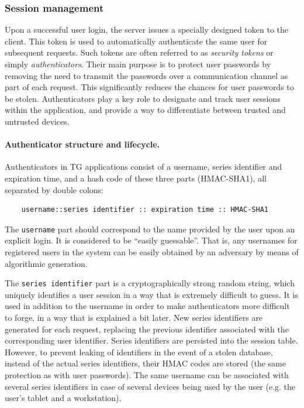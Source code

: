 \documentclass[a4paper,12pt,oneside,openright]{memoir}
\begin{document}
\subsubsection*{Session management}
	Upon a successful user login, the server issues a specially designed token to the client.
	This token is used to automatically authenticate the same user for subsequent requests.
	Such tokens are often referred to as \emph{security tokens} or simply \emph{authenticators}.
	Their main purpose is to protect user passwords by removing the need to transmit the passwords over a communication channel as part of each request.
	This significantly reduces the chances for user passwords to be stolen.
	Authenticators play a key role to designate and track user sessions within the application, and provide a way to differentiate between trusted and untrusted devices.

	\paragraph{Authenticator structure and lifecycle.}
	Authenticators in TG applications consist of a username, series identifier and expiration time, and a hash code of these three parts (HMAC-SHA1), all separated by double colons:
	\begin{verbatim}
	username::series identifier :: expiration time :: HMAC-SHA1
	\end{verbatim}

	The \texttt{username} part should correspond to the name provided by the user upon an explicit login.
	It is considered to be ``easily guessable''.
	That is, any usernames for registered users in the system can be easily obtained by an adversary by means of algorithmic generation.

	The \texttt{series identifier} part is a cryptographically strong random string, which uniquely identifies a user session in a way that is extremely difficult to guess.
	It is used in addition to the username in order to make authenticators more difficult to forge, in a way that is explained a bit later.
	New series identifiers are generated for each request, replacing the previous identifier associated with the corresponding user identifier.
	Series identifiers are persisted into the session table.
	However, to prevent leaking of identifiers in the event of a stolen database, instead of the actual series identifiers, their HMAC codes are stored (the same protection as with user passwords).
	The same username can be associated with several series identifiers in case of several devices being used by the user (e.g. the user's tablet and a workstation).
\end{document}
